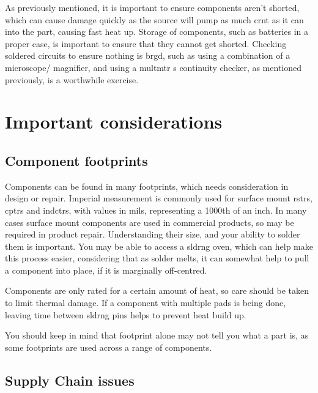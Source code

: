 \documentclass[a4paper,11pt]{report}
\begin{document}
As previously mentioned, it is important to ensure components aren't shorted, which can cause damage quickly as the source will pump as much \gls{crnt} as it can into the part, causing fast heat up. Storage of components, such as batteries in a proper case, is important to ensure that they cannot get shorted. Checking soldered circuits to ensure nothing is \gls{brgd}, such as using a combination of a microscope/ magnifier, and using a \gls{multmtr} s continuity checker, as mentioned previously, is a worthwhile exercise.

\pagebreak

\section{Important considerations}

\vspace*{1\baselineskip}

\subsection{Component footprints}

Components can be found in many footprints, which needs consideration in design or repair. Imperial measurement is commonly used for surface mount \gls{rstr}s, \gls{cptr}s and \gls{indctr}s, with values in mils, representing a 1000th of an inch. In many cases surface mount components are used in commercial products, so may be required in product repair. Understanding their size, and your ability to solder them is important. You may be able to access a \gls{sldrng} oven, which can help make this process easier, considering that as solder melts, it can somewhat help to pull a component into place, if it is marginally off-centred.

Components are only rated for a certain amount of heat, so care should be taken to limit thermal damage. If a component with multiple pads is being done, leaving time between \gls{sldrng} pins helps to prevent heat build up.

You should keep in mind that footprint alone may not tell you what a part is, as some footprints are used across a range of components.

\vspace*{1\baselineskip}

\subsection{Supply Chain issues}
\end{document}

